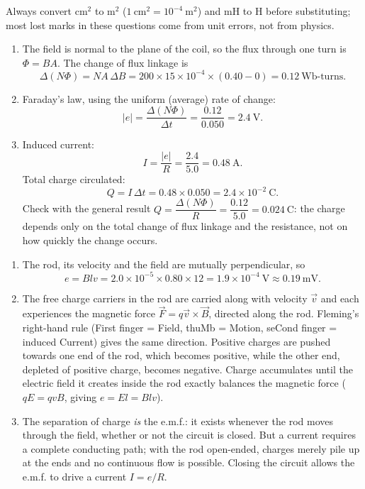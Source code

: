\documentclass[11pt]{article}
\newcounter{popsec}
\newcounter{popsub}
\newcommand{\courssub}[1]{%
  \stepcounter{popsub}%
  \par\vspace{9pt}\noindent{\popxbold\fontsize{11.5}{13}\selectfont\color{popink}{\color{poporange}\thepopsec.\thepopsub}\hspace{6pt}#1}\par\nopagebreak\vspace{4pt}
}
\begin{document}
\begin{attention}
Always convert $\mathrm{cm^2}$ to $\mathrm{m^2}$ ($1\ \mathrm{cm^2} = 10^{-4}\ \mathrm{m^2}$) and $\mathrm{mH}$ to $\mathrm{H}$ before substituting; most lost marks in these questions come from unit errors, not from physics.
\end{attention}

\courssub{I practise}

\begin{corrige}
\begin{enumerate}
\item The field is normal to the plane of the coil, so the flux through one turn is $\Phi = BA$. The change of flux linkage is
\[ \Delta(N\Phi) = NA\,\Delta B = 200 \times 15\times10^{-4} \times (0.40 - 0) = 0.12\ \mathrm{Wb\text{-}turns}. \]
\item Faraday's law, using the uniform (average) rate of change:
\[ |e| = \frac{\Delta(N\Phi)}{\Delta t} = \frac{0.12}{0.050} = 2.4\ \mathrm{V}. \]
\item Induced current:
\[ I = \frac{|e|}{R} = \frac{2.4}{5.0} = 0.48\ \mathrm{A}. \]
Total charge circulated:
\[ Q = I\,\Delta t = 0.48 \times 0.050 = 2.4\times10^{-2}\ \mathrm{C}. \]
Check with the general result $Q = \dfrac{\Delta(N\Phi)}{R} = \dfrac{0.12}{5.0} = 0.024\ \mathrm{C}$: the charge depends only on the total change of flux linkage and the resistance, not on how quickly the change occurs.
\end{enumerate}
\end{corrige}

\begin{corrige}
\begin{enumerate}
\item The rod, its velocity and the field are mutually perpendicular, so
\[ e = Blv = 2.0\times10^{-5} \times 0.80 \times 12 = 1.9\times10^{-4}\ \mathrm{V} \approx 0.19\ \mathrm{mV}. \]
\item The free charge carriers in the rod are carried along with velocity $\vec{v}$ and each experiences the magnetic force $\vec{F} = q\vec{v}\times\vec{B}$, directed along the rod. Fleming's right-hand rule (First finger = Field, thuMb = Motion, seCond finger = induced Current) gives the same direction. Positive charges are pushed towards one end of the rod, which becomes positive, while the other end, depleted of positive charge, becomes negative. Charge accumulates until the electric field it creates inside the rod exactly balances the magnetic force ($qE = qvB$, giving $e = El = Blv$).
\item The separation of charge \emph{is} the e.m.f.: it exists whenever the rod moves through the field, whether or not the circuit is closed. But a current requires a complete conducting path; with the rod open-ended, charges merely pile up at the ends and no continuous flow is possible. Closing the circuit allows the e.m.f. to drive a current $I = e/R$.
\end{enumerate}
\end{corrige}
\end{document}
